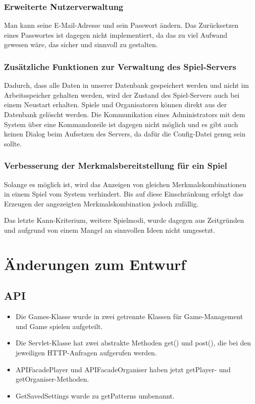 \documentclass[a4paper]{scrreprt}
\begin{document}
\subsection{Erweiterte Nutzerverwaltung}
Man kann seine E-Mail-Adresse und sein Passwort ändern. Das Zurücksetzen eines Passwortes ist dagegen nicht implementiert, da das zu viel Aufwand gewesen wäre, das sicher und sinnvoll zu gestalten.

\subsection{Zusätzliche Funktionen zur Verwaltung des Spiel-Servers}
Dadurch, dass alle Daten in unserer Datenbank gespeichert werden und nicht im Arbeitsspeicher gehalten werden, wird der Zustand des Spiel-Servers auch bei einem Neustart erhalten. Spiele und Organisatoren können direkt aus der Datenbank gelöscht werden. Die Kommunikation eines Administrators mit dem System über eine Kommandozeile ist dagegen nicht möglich und es gibt auch keinen Dialog beim Aufsetzen des Servers, da dafür die Config-Datei genug sein sollte.

\subsection{Verbesserung der Merkmalsbereitstellung für ein Spiel}
Solange es möglich ist, wird das Anzeigen von gleichen Merkmalskombinationen in einem Spiel vom System verhindert. Bis auf diese Einschränkung erfolgt das Erzeugen der angezeigten Merkmalskombination jedoch zufällig.



\hspace{1cm}

Das letzte Kann-Kriterium, weitere Spielmodi, wurde dagegen aus Zeitgründen und aufgrund von einem Mangel an sinnvollen Ideen nicht umgesetzt.

\chapter{Änderungen zum Entwurf}
\section{API}
\begin{itemize}
    \item Die Games-Klasse wurde in zwei getrennte Klassen für Game-Management und Game spielen aufgeteilt.
    \item Die Servlet-Klasse hat zwei abstrakte Methoden get() und post(), die bei den jeweiligen HTTP-Anfragen aufgerufen werden.
    \item APIFacadePlayer und APIFacadeOrganiser haben jetzt getPlayer- und getOrganiser-Methoden.
    \item GetSavedSettings wurde zu getPatterns umbenannt.
\end{itemize}
\end{document}
